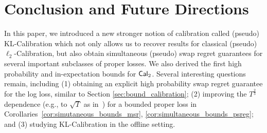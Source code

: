 \section{Conclusion and Future Directions}
In this paper, we introduced a new stronger notion of calibration called (pseudo) KL-Calibration which not only allows us to recover results for classical (pseudo) $\ell_{2}$-Calibration, but also obtain simultaneous (pseudo) swap regret guarantees for several important subclasses of proper losses. We also derived the first high probability and in-expectation bounds for $\cal_{2}$. Several interesting questions remain, including (1) obtaining an explicit high probability swap regret guarantee for the log loss, similar to Section \ref{sec:bound_calibration}; (2) improving the $T^{\frac{2}{3}}$ dependence (e.g., to $\sqrt{T}$ as in~\citet{hu2024predict}) for a bounded proper loss in Corollaries~\ref{cor:simutaneous_bounds_msr}, \ref{cor:simultaneous_bounds_psreg}; and (3) studying KL-Calibration in the offline setting.